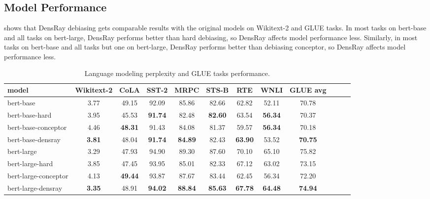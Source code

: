 \subsection{Model Performance}
 shows that DensRay debiasing gets comparable results with
the original models on Wikitext-2 and GLUE tasks.
In most tasks on bert-base and all tasks on bert-large, DensRay performs better than hard debiasing, so DensRay affects model performance less.
Similarly, in most tasks on bert-base and all tasks but one
on bert-large, DensRay performs better than debiasing conceptor, so DensRay affects model performance less.
\begin{table}[h]
\centering
\footnotesize
\begin{tabular}{l||c|cccccccccc}
model & Wikitext-2&CoLA &SST-2&MRPC&STS-B&RTE&WNLI&GLUE avg\\
\hline\hline
		bert-base &3.77&49.15&92.09&85.86&82.66&62.82&52.11&70.78\\
bert-base-hard &3.95&45.53&\textbf{91.74}&82.48&\textbf{82.60}&63.54&\textbf{56.34}&70.37\\
bert-base-conceptor &4.46&\textbf{48.31}&91.43&84.08&81.37&59.57&\textbf{56.34}&70.18\\
bert-base-densray &\textbf{3.81}&48.04&\textbf{91.74}&\textbf{84.89}&82.43&\textbf{63.90}&53.52&\textbf{70.75}\\
\hline
bert-large &3.29& 47.93&94.90&89.30&87.60&70.10&65.10&75.82\\
bert-large-hard &3.85& 47.45&93.95&85.01&82.33&67.12&63.02&73.15\\
bert-large-conceptor &4.13&\textbf{49.44}&93.87&87.67&83.44&62.45&56.34&72.20\\
bert-large-densray &\textbf{3.35}& 48.91&\textbf{94.02}&\textbf{88.84}&\textbf{85.63}&\textbf{67.78}&\textbf{64.48}&\textbf{74.94}\\
\end{tabular}
\caption{
Language modeling perplexity and GLUE tasks
performance. }
\end{table}


